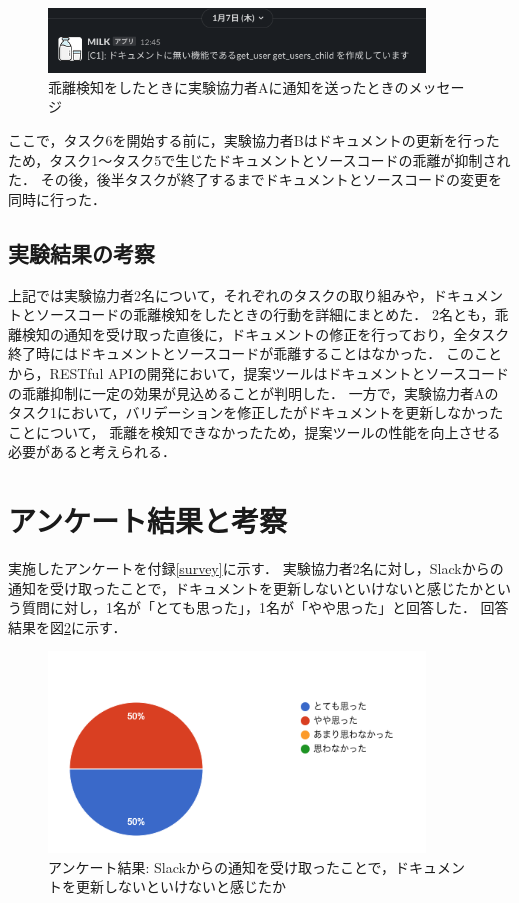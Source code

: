 \begin{figure}[H]
    \centering
    \includegraphics[width=10cm]{images/notification2.png}
    \caption{乖離検知をしたときに実験協力者Aに通知を送ったときのメッセージ}
    \label{notification2}
\end{figure}

ここで，タスク6を開始する前に，実験協力者Bはドキュメントの更新を行ったため，タスク1〜タスク5で生じたドキュメントとソースコードの乖離が抑制された．
その後，後半タスクが終了するまでドキュメントとソースコードの変更を同時に行った．

\subsection{実験結果の考察}
上記では実験協力者2名について，それぞれのタスクの取り組みや，ドキュメントとソースコードの乖離検知をしたときの行動を詳細にまとめた．
2名とも，乖離検知の通知を受け取った直後に，ドキュメントの修正を行っており，全タスク終了時にはドキュメントとソースコードが乖離することはなかった．
このことから，RESTful APIの開発において，提案ツールはドキュメントとソースコードの乖離抑制に一定の効果が見込めることが判明した．
一方で，実験協力者Aのタスク1において，バリデーションを修正したがドキュメントを更新しなかったことについて，
乖離を検知できなかったため，提案ツールの性能を向上させる必要があると考えられる．

\section{アンケート結果と考察}
実施したアンケートを付録\ref{survey}に示す．
実験協力者2名に対し，Slackからの通知を受け取ったことで，ドキュメントを更新しないといけないと感じたかという質問に対し，1名が「とても思った」，1名が「やや思った」と回答した．
回答結果を図\ref{q1}に示す．
\begin{figure}[H]
    \centering
    \includegraphics[width=10cm]{images/q1.png}
    \caption{アンケート結果: Slackからの通知を受け取ったことで，ドキュメントを更新しないといけないと感じたか}
    \label{q1}
\end{figure}

